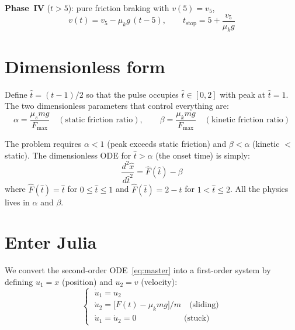 \documentclass[11pt, a4paper]{article}
\newcommand{\ddd}[2]{\frac{d^2 #1}{d #2^2}}
\begin{document}
\medskip
\noindent
\textbf{Phase~IV} ($t > 5$): pure friction braking with $v(5) = v_5$,
\begin{equation}
v(t) = v_5 - \mu_k g\,(t - 5), \qquad
t_{\text{stop}} = 5 + \frac{v_5}{\mu_k g}
\label{eq:tstop}
\end{equation}

\section{Dimensionless form}
\label{sec:dimless}

Define $\hat{t} = (t - 1)/2$ so that the pulse occupies $\hat{t} \in [0, 2]$
with peak at $\hat{t} = 1$.  The two dimensionless parameters that control
everything are:
\begin{equation}
\boxed{
\alpha = \frac{\mu_s m g}{F_{\max}} \quad (\text{static friction ratio}),
\qquad
\beta = \frac{\mu_k m g}{F_{\max}} \quad (\text{kinetic friction ratio})
}
\label{eq:dimless_params}
\end{equation}

\noindent
The problem requires $\alpha < 1$ (peak exceeds static friction) and
$\beta < \alpha$ (kinetic $<$ static).  The dimensionless ODE for
$\hat{t} > \alpha$ (the onset time) is simply:
\begin{equation}
\boxed{\ddd{\hat{x}}{\hat{t}} = \hat{F}(\hat{t}) - \beta}
\label{eq:dimless_ode}
\end{equation}
where $\hat{F}(\hat{t}) = \hat{t}$ for $0 \le \hat{t} \le 1$ and
$\hat{F}(\hat{t}) = 2 - \hat{t}$ for $1 < \hat{t} \le 2$.
All the physics lives in $\alpha$ and $\beta$.

\section{Enter Julia}
\label{sec:julia}

We convert the second-order ODE~\eqref{eq:master} into a first-order system
by defining $u_1 = x$ (position) and $u_2 = v$ (velocity):
\begin{equation}
\begin{cases}
\;\dot{u}_1 = u_2 \\[6pt]
\;\dot{u}_2 = \bigl[F(t) - \mu_k m g\bigr] / m \quad \text{(sliding)} \\[4pt]
\;\dot{u}_1 = \dot{u}_2 = 0 \quad\qquad\qquad\;\;\; \text{(stuck)}
\end{cases}
\label{eq:system}
\end{equation}
\end{document}
